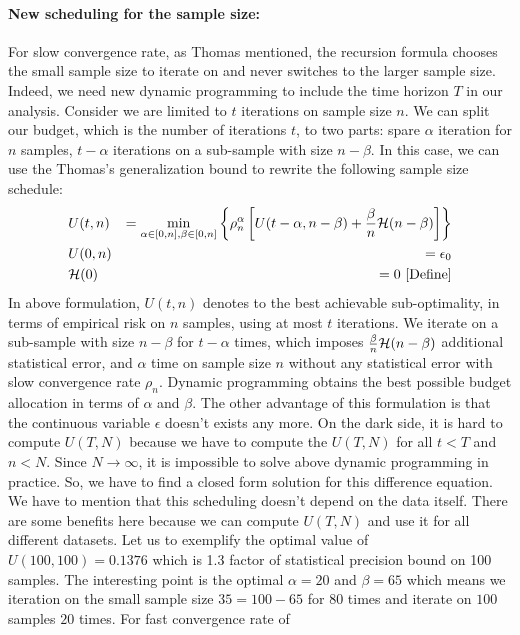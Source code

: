 \documentclass{article}
\newcommand{\bound}{{\cal H}}
\begin{document}
\paragraph{New scheduling for the sample size:}
For slow convergence rate, as Thomas mentioned, the
recursion formula chooses the small sample size to iterate on and never switches to the larger sample size.
Indeed, we need new dynamic programming to include the time horizon $T$ in our analysis. Consider we are limited to $t$
iterations on sample size $n$. We can split our budget, which is the number of
iterations $t$, to two parts: spare $\alpha$ iteration for $n$ samples, $t-\alpha$ iterations on a sub-sample with size $n-\beta$. In this case, we can use the
Thomas's generalization bound to rewrite the following sample size schedule: 
\begin{eqnarray}
& U(t,n)  
& = \min_{\alpha \in [0,n],\beta\in [0,n]} \left\{ \rho_n^{\alpha}  \left[
U(t-\alpha,n-\beta) + \frac{\beta}{n}\bound(n-\beta)\right] \right\}\\
& U(0,n) &= \epsilon_0 \\ 
& \bound(0) &=0 \text{  [Define]}
\end{eqnarray}
In above formulation, $U(t,n)$ denotes to the best achievable sub-optimality,
in terms of empirical risk on $n$ samples, using at most $t$
iterations. We iterate on a sub-sample with size $n-\beta$ for $t-\alpha$
times, which imposes $\frac{\beta}{n}\bound(n-\beta)$ additional statistical
error, and $\alpha$ time on sample size $n$ without any statistical error with
slow convergence rate $\rho_n$. Dynamic programming obtains the best possible
budget allocation in terms of $\alpha$ and $\beta$. The other advantage of this
formulation is that the continuous variable $\epsilon$ doesn't exists any more. 
On the dark side,  it is hard to compute $U(T,N)$ because we have to compute the
$U(T,N)$ for all $t<T$ and $n<N$. Since $N \rightarrow \infty$, it is impossible
 to solve above dynamic programming in practice. So, we have to find a closed
  form solution for this difference equation. 
  We have to mention that this scheduling doesn't depend on the data itself.
   There are some benefits here because we can compute $U(T,N)$ and use it for
   all different datasets. Let us to exemplify the optimal value of
   $U(100,100) =  0.1376$ which is 1.3 factor of statistical precision bound on
   100 samples. The interesting point is the optimal $\alpha = 20$ and $\beta =
   65$ which means we iteration on the small sample size $35 = 100 - 65$ for 80
   times and iterate on $100$ samples $20$ times. For fast convergence rate of
\end{document}
